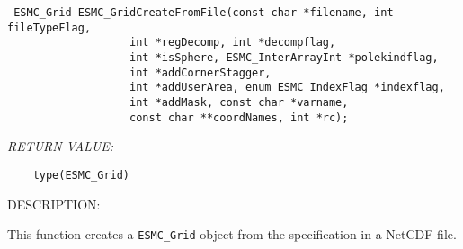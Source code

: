   
\begin{verbatim} ESMC_Grid ESMC_GridCreateFromFile(const char *filename, int fileTypeFlag, 
                   int *regDecomp, int *decompflag,
                   int *isSphere, ESMC_InterArrayInt *polekindflag,
                   int *addCornerStagger,
                   int *addUserArea, enum ESMC_IndexFlag *indexflag,
                   int *addMask, const char *varname,
                   const char **coordNames, int *rc);\end{verbatim}{\em RETURN VALUE:}
\begin{verbatim}    type(ESMC_Grid)\end{verbatim}
{\sf DESCRIPTION:\\ }


   This function creates a {\tt ESMC\_Grid} object from the specification in
   a NetCDF file.
  
